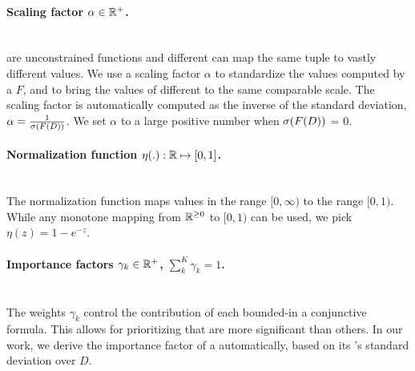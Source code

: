 \smallskip 
\paragraph{Scaling factor $\alpha\in{\mathbb{R}}^+$.}\\ \Views are unconstrained
functions and different \views can map the same tuple to vastly different
values. We use a scaling factor $\alpha$ to standardize the values computed by
a \view $F$, and to bring the values of different \views to the same comparable
scale. The scaling factor is automatically computed as the inverse of the
standard deviation, $\alpha = \tfrac{1}{{\mathtt{\sigma}}(F(D))}$. 
We set $\alpha$ to a large positive number when ${\mathtt{\sigma}}(F(D))$ = $0$.


\smallskip
\paragraph{Normalization function $\eta(.): {\mathbb{R}}\mapsto [0,1]$.}\\
The normalization function
maps values in the range $[0,\infty)$ to the range $[0,1)$.
While any monotone mapping from ${\mathbb{R}}^{\geq 0}$ to $[0,1)$ can be used, we
pick $\eta(z) = 1 - e^{-z}$.

\smallskip 
\paragraph{Importance factors $\gamma_k\in {\mathbb{R}}^+$, $\textstyle\sum_{k}^{K}\gamma_k {=} 1$.}\\
The weights $\gamma_k$ control the contribution of each bounded-\view \invariant in a
conjunctive formula. This allows for prioritizing \invariants that are more
significant than others.
In our work, we derive the importance factor of a \invariant automatically,
based on its \view's standard deviation over $D$.

